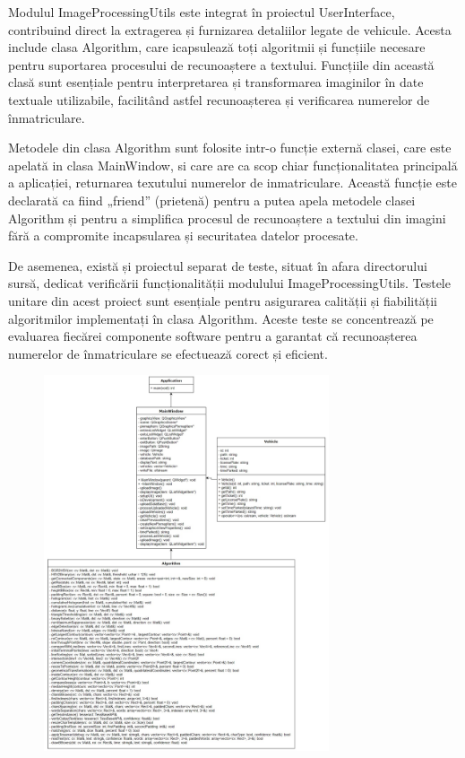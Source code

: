 \documentclass[a4paper,12pt]{report}
\begin{document}
Modulul ImageProcessingUtils este integrat în proiectul UserInterface, contribuind direct la extragerea și furnizarea detaliilor legate de vehicule. Acesta include clasa Algorithm, care icapsulează toți algoritmii și funcțiile necesare pentru suportarea procesului de recunoaștere a textului. Funcțiile din această clasă sunt esențiale pentru interpretarea și transformarea imaginilor în date textuale utilizabile, facilitând astfel recunoașterea și verificarea numerelor de înmatriculare.

Metodele din clasa Algorithm sunt folosite intr-o funcție externă clasei, care este apelată in clasa MainWindow, si care are ca scop chiar funcționalitatea principală a aplicației, returnarea texutului numerelor de inmatriculare. Această funcție este declarată ca fiind „friend” (prietenă) pentru a putea apela metodele clasei Algorithm și pentru a simplifica procesul de recunoaștere a textului din imagini fără a compromite incapsularea și securitatea datelor procesate.

De asemenea, există și proiectul separat de teste, situat în afara directorului sursă, dedicat verificării funcționalității modulului ImageProcessingUtils. Testele unitare din acest proiect sunt esențiale pentru asigurarea calității și fiabilității algoritmilor implementați în clasa Algorithm. Aceste teste se concentrează pe evaluarea fiecărei componente software pentru a garantat că recunoașterea numerelor de înmatriculare se efectuează corect și eficient.

\begin{figure}[h]
    \centering
    \includegraphics[width=0.75\textwidth]{images/UML.jpg}
\end{figure}
\FloatBarrier
\end{document}
